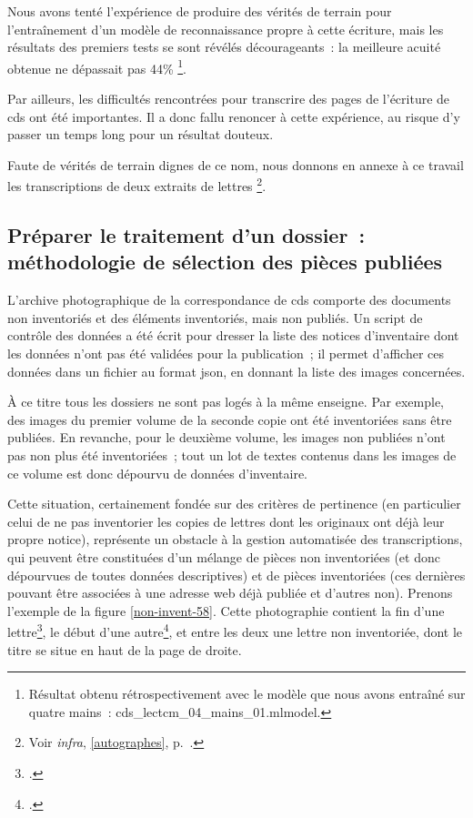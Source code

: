 \documentclass[a4paper,12pt,twoside]{book}
\begin{document}
				Nous avons tenté l'expérience de produire des vérités de terrain pour l'entraînement d'un modèle de reconnaissance propre à cette écriture, mais les résultats des premiers tests se sont révélés décourageants~: la meilleure acuité obtenue ne dépassait pas 44\%
				\footnote{
					Résultat obtenu rétrospectivement avec le modèle que nous avons entraîné sur quatre mains~: cds\_lectcm\_04\_mains\_01.mlmodel.
					}.
				
				Par ailleurs, les difficultés rencontrées pour transcrire des pages de l'écriture de \gls{cds} ont été importantes. Il a donc fallu renoncer à cette expérience, au risque d'y passer un temps long pour un résultat douteux.
				
				Faute de vérités de terrain dignes de ce nom, nous donnons en annexe à ce travail les transcriptions de deux extraits de lettres
				\footnote{Voir \textit{infra}, \ref{autographes}, p.~\pageref{autographes}.}.
		
			\subsection[Préparer le traitement d'un dossier]{Préparer le traitement d'un dossier~: méthodologie de sélection des pièces publiées}
				L'archive photographique de la correspondance de \gls{cds} comporte des documents non inventoriés et des éléments inventoriés, mais non publiés. Un script de contrôle des données a été écrit pour dresser la liste des notices d'inventaire dont les données n'ont pas été validées pour la publication\cite{biayDonneesNonPublieesPy2022}~; il permet d'afficher ces données dans un fichier au format \gls{json}, en donnant la liste des images concernées.
				
				À ce titre tous les dossiers ne sont pas logés à la même enseigne. Par exemple, des images du premier volume de la seconde copie\cite{CdS02001330} ont été inventoriées sans être publiées. En revanche, pour le deuxième volume\cite{CdS02001369}, les images non publiées n'ont pas non plus été inventoriées~; tout un lot de textes contenus dans les images de ce volume est donc dépourvu de données d'inventaire. 
				
				Cette situation, certainement fondée sur des critères de pertinence (en particulier celui de ne pas inventorier les copies de lettres dont les originaux ont déjà leur propre notice), représente un obstacle à la gestion automatisée des transcriptions, qui peuvent être constituées d'un mélange de pièces non inventoriées (et donc dépourvues de toutes données descriptives) et de pièces inventoriées (ces dernières pouvant être associées à une adresse web déjà publiée et d'autres non). Prenons l'exemple de la figure \ref{non-invent-58}. Cette photographie contient la fin d'une lettre\footcite{CdS02057058}, le début d'une autre\footcite{CdS02058059}, et entre les deux une lettre non inventoriée, dont le titre se situe en haut de la page de droite.
				
\end{document}
